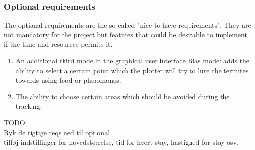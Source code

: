 \subsubsection{Optional requirements}
The optional requirements are the so called "nice-to-have requirements". They are not mandatory for the project but features that could be desirable to implement if the time and resources permits it.

\begin{enumerate}
	\item An additional third mode in the graphical user interface Bias mode: adds the ability to select a certain point which the plotter will try to lure the termites towards using food or pheromones.
    \item The ability to choose certain areas which should be avoided during the tracking.
\end{enumerate}

TODO: \\
Ryk de rigtige reqs ned til optional \\
tilføj indstillinger for hovedstørrelse, tid for hvert stay, hastighed for stay osv.


